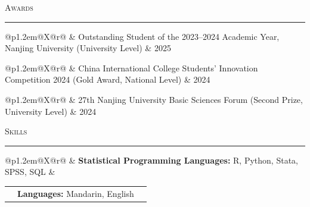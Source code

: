 \documentclass[10pt,letterpaper]{article}
\makeatletter
\newcommand{\cvsection}[1]{%
  \par
  \Needspace{4\baselineskip}%
  \vspace{0.66em}%
  {\Large\scshape #1}\par\nobreak
  \vspace{0.28em}%
  \hrule\nobreak
  \vspace{0.40em}%
}
\newcommand{\cvbullet}[2]{%
  \par\noindent
  \begin{tabularx}{\linewidth}{
    @{}p{1.2em}@{}X@{\hspace{0.6em}}r@{}
  }
    \textbullet & #1 & #2
  \end{tabularx}%
  \par\vspace{0.34em}%
}
\makeatother
\begin{document}
\cvsection{Awards}

\cvbullet{
  Outstanding Student of the
  2023--2024 Academic Year,
  Nanjing University (University Level)
}{2025}

\cvbullet{
  China International College Students'
  Innovation Competition 2024
  (Gold Award, National Level)
}{2024}

\cvbullet{
  27th Nanjing University Basic Sciences
  Forum (Second Prize, University Level)
}{2024}


\cvsection{Skills}

\cvbullet{
  \textbf{Statistical Programming Languages:}
  \quad R, Python, Stata, SPSS, SQL
}{}

\cvbullet{
  \textbf{Languages:}
  \quad Mandarin, English
}{}
\end{document}
